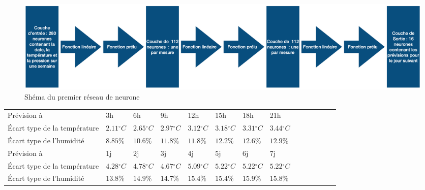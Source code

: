 \documentclass[11pt,a4paper]{article}
\begin{document}
\begin{figure} [H]
\centering
\includegraphics[width=1 \textwidth]{./imagesTIPE/schemaRN.png}
\caption{\label{fig:schemaRN} Shéma du premier réseau de neurone}
\end{figure}



\begin{tabular}{llllllllllllll} 
\hline
\hline
Prévision à                  &3h                         &6h                        &9h                           &12h                         &15h                          &18h          &         21h      \\
Écart type de la température& $2.11{}^{\circ}C$& $2.65{}^{\circ}C$& $2.97{}^{\circ}C$& $3.12{}^{\circ}C$& $3.18{}^{\circ}C$& $3.31{}^{\circ}C$&$3.44{}^{\circ}C$ \\
Écart type de l'humidité &$8.85\%$ & $10.6\%$ & $11.8\%$ & $11.8\%$ & $12.2\%$ & $12.6\%$ & $12.9\%$  \\
\hline
Prévision à                  & 1j &           2j            &3j            &4j          &5j            & 6j & 7j \\
Écart type de la température & $4.28{}^{\circ}C$ & $4.78{}^{\circ}C$ & $4.67{}^{\circ}C$ & $5.09{}^{\circ}C$ & $5.22{}^{\circ}C$ & $5.22{}^{\circ}C$  & $5.22{}^{\circ}C$ \\
Écart type de l'humidité      & $13.8\%$ &  $ 14.9\% $    &  $ 14.7\% $         &  $ 15.4\% $        &  $ 15.4\% $         &  $ 15.9\% $  &  $ 15.8\% $  \\
\hline 
\end{tabular}
\end{document}
